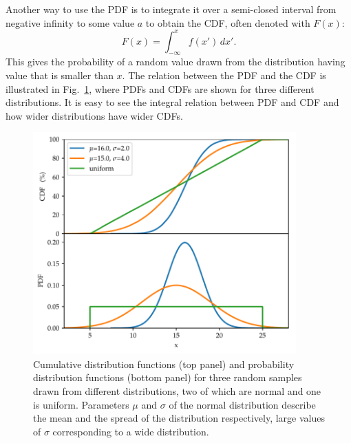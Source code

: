\documentclass[english, oneside]{HYgradu}
\begin{document}
Another way to use the PDF is to integrate it over a semi-closed interval from negative infinity to some value $a$ to obtain the CDF, often denoted with $F(x)$:
\begin{equation}
	F(x) = \int_{-\infty}^x f(x') \,dx'.
\end{equation}	
This gives the probability of a random value drawn from the distribution having value that is smaller than $x$. The relation between the PDF and the CDF is illustrated in Fig.\ \ref{fig:cdf}, where PDFs and CDFs are shown for three different distributions. It is easy to see the integral relation between PDF and CDF and how wider distributions have wider CDFs. \citep{htk}

\begin{figure}
   \centering
   \includegraphics[width=0.9\textwidth]{kuvat/cdf.pdf}
   \caption{Cumulative distribution functions (top panel) and probability distribution functions (bottom panel) for three random samples drawn from different distributions, two of which are normal and one is uniform. Parameters $\mu$ and $\sigma$ of the normal distribution describe the mean and the spread of the distribution respectively, large values of $\sigma$ corresponding to a wide distribution.}
   \label{fig:cdf}

\end{figure}
\end{document}
